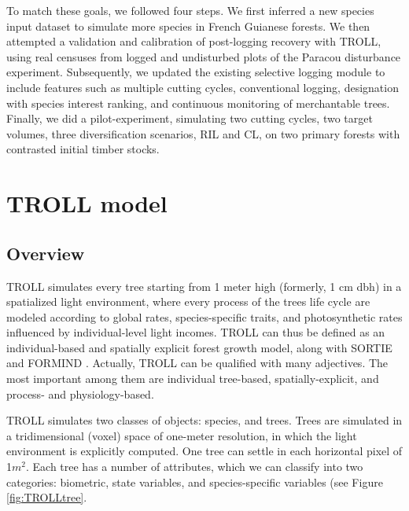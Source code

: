 \documentclass[12pt,]{article}
\let\oldsection\section
\renewcommand\section{\newpage\oldsection}
\theoremstyle{definition}
\theoremstyle{definition}
\theoremstyle{definition}
\theoremstyle{remark}
\begin{document}
To match these goals, we followed four steps. We first inferred a new
species input dataset to simulate more species in French Guianese
forests. We then attempted a validation and calibration of post-logging
recovery with TROLL, using real censuses from logged and undisturbed
plots of the Paracou disturbance experiment. Subsequently, we updated
the existing selective logging module to include features such as
multiple cutting cycles, conventional logging, designation with species
interest ranking, and continuous monitoring of merchantable trees.
Finally, we did a pilot-experiment, simulating two cutting cycles, two
target volumes, three diversification scenarios, RIL and CL, on two
primary forests with contrasted initial timber stocks.

\section{TROLL model}\label{troll-model}

\subsection{Overview}\label{overview}

TROLL simulates every tree starting from 1 meter high (formerly, 1 cm
dbh) in a spatialized light environment, where every process of the
trees life cycle are modeled according to global rates, species-specific
traits, and photosynthetic rates influenced by individual-level light
incomes. TROLL can thus be defined as an individual-based and spatially
explicit forest growth model, along with SORTIE
\citep{Pacala1996, Uriarte2009} and FORMIND \citep{Fischer2016}.
Actually, TROLL can be qualified with many adjectives. The most
important among them are individual tree-based, spatially-explicit, and
process- and physiology-based.

TROLL simulates two classes of objects: species, and trees. Trees are
simulated in a tridimensional (voxel) space of one-meter resolution, in
which the light environment is explicitly computed. One tree can settle
in each horizontal pixel of 1\(m^2\). Each tree has a number of
attributes, which we can classify into two categories: biometric, state
variables, and species-specific variables (see Figure
\ref{fig:TROLLtree}.
\end{document}
